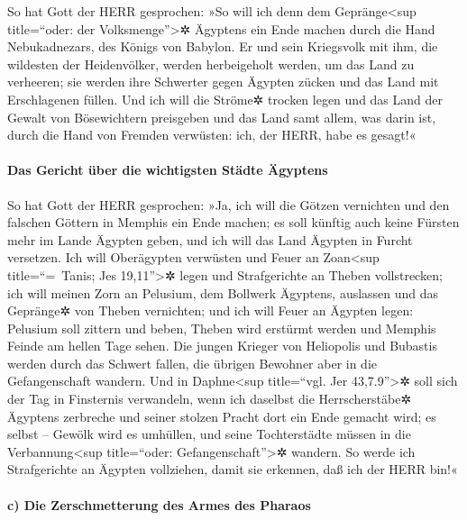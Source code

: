 So hat Gott der HERR gesprochen: »So will ich denn dem
Gepränge\textless sup title=``oder: der Volksmenge''\textgreater✲
Ägyptens ein Ende machen durch die Hand Nebukadnezars, des Königs von
Babylon. Er und sein Kriegsvolk mit ihm, die wildesten
der Heidenvölker, werden herbeigeholt werden, um das Land zu verheeren;
sie werden ihre Schwerter gegen Ägypten zücken und das Land mit
Erschlagenen füllen. Und ich will die Ströme✲ trocken
legen und das Land der Gewalt von Bösewichtern preisgeben und das Land
samt allem, was darin ist, durch die Hand von Fremden verwüsten: ich,
der HERR, habe es gesagt!«

\hypertarget{das-gericht-uxfcber-die-wichtigsten-stuxe4dte-uxe4gyptens}{%
\paragraph{Das Gericht über die wichtigsten Städte
Ägyptens}\label{das-gericht-uxfcber-die-wichtigsten-stuxe4dte-uxe4gyptens}}

So hat Gott der HERR gesprochen: »Ja, ich will die Götzen
vernichten und den falschen Göttern in Memphis ein Ende machen; es soll
künftig auch keine Fürsten mehr im Lande Ägypten geben, und ich will das
Land Ägypten in Furcht versetzen. Ich will Oberägypten
verwüsten und Feuer an Zoan\textless sup title=``=~Tanis; Jes
19,11''\textgreater✲ legen und Strafgerichte an Theben vollstrecken;
ich will meinen Zorn an Pelusium, dem Bollwerk Ägyptens,
auslassen und das Gepränge✲ von Theben vernichten; und
ich will Feuer an Ägypten legen: Pelusium soll zittern und beben, Theben
wird erstürmt werden und Memphis Feinde am hellen Tage sehen.
Die jungen Krieger von Heliopolis und Bubastis werden
durch das Schwert fallen, die übrigen Bewohner aber in die
Gefangenschaft wandern. Und in Daphne\textless sup
title=``vgl. Jer 43,7.9''\textgreater✲ soll sich der Tag in Finsternis
verwandeln, wenn ich daselbst die Herrscherstäbe✲ Ägyptens zerbreche und
seiner stolzen Pracht dort ein Ende gemacht wird; es selbst -- Gewölk
wird es umhüllen, und seine Tochterstädte müssen in die
Verbannung\textless sup title=``oder: Gefangenschaft''\textgreater✲
wandern. So werde ich Strafgerichte an Ägypten
vollziehen, damit sie erkennen, daß ich der HERR bin!«

\hypertarget{c-die-zerschmetterung-des-armes-des-pharaos}{%
\paragraph{c) Die Zerschmetterung des Armes des
Pharaos}\label{c-die-zerschmetterung-des-armes-des-pharaos}}

